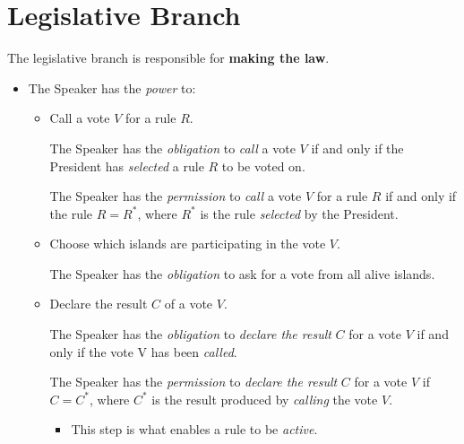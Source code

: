\section{Legislative Branch}
\label{sec:legislative}
The legislative branch is responsible for \textbf{making the law}.
\begin{itemize}

    \item The Speaker has the \emph{power} to:
    \begin{itemize}
        
        \item Call a vote $V$ for a rule $R$.
        \begin{rule_IIGO}
            The Speaker has the \emph{obligation} to \emph{call} a vote $V$ if and only if the President has \emph{selected} a rule $R$ to be voted on.
        \end {rule_IIGO}
        \begin{rule_IIGO}
            The Speaker has the \emph{permission} to \emph{call} a vote $V$ for a rule $R$ if and only if the rule $R = R^{*}$, where $R^{*}$ is the rule \emph{selected} by the President.
        \end {rule_IIGO}
            
        \item Choose which islands are participating in the vote $V$.
        \begin{rule_IIGO}
            The Speaker has the \emph{obligation} to ask for a vote from all alive islands.
        \end {rule_IIGO}
            
        \item Declare the result $C$ of a vote $V$. 
        \begin{rule_IIGO}
            The Speaker has the \emph{obligation} to \emph{declare the result} $C$ for a vote $V$ if and only if the vote V has been \emph{called}.
        \end {rule_IIGO}
        \begin{rule_IIGO}
            The Speaker has the \emph{permission} to \emph{declare the result} $C$ for a vote $V$ if $C = C^{*}$, where $C^{*}$ is the result produced by \emph{calling} the vote $V$.
        \end {rule_IIGO}
        \begin{itemize}
            \item This step is what enables a rule to be \emph{active}.
        \end{itemize}
    \end{itemize}
\end{itemize}




